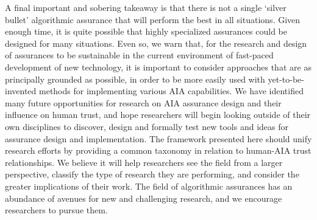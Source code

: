 A final important and sobering takeaway is that there is not a single `silver bullet' algorithmic assurance that will perform the best in all situations. 
Given enough time, it is quite possible that highly specialized assurances could be designed for many situations. Even so, we warn that, for the research and design of assurances to be sustainable in the current environment of fast-paced development of new technology, it is important to consider approaches that are as principally grounded as possible, in order to be more easily used with yet-to-be-invented methods for implementing various AIA capabilities. We have identified many future opportunities for research on AIA assurance design and their influence on human trust, and hope researchers will begin looking outside of their own disciplines to discover, design and formally test new tools and ideas for assurance design and implementation. The framework presented here should unify research efforts by providing a common taxonomy in relation to human-AIA trust relationships. We believe it will help researchers see the field from a larger perspective, classify the type of research they are performing, and consider the greater implications of their work. The field of algorithmic assurances has an abundance of avenues for new and challenging research, and we encourage researchers to pursue them.
